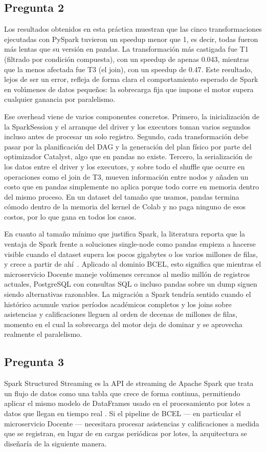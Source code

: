 \documentclass[11pt,a4paper]{article}
\begin{document}
\subsection*{Pregunta 2}
Los resultados obtenidos en esta práctica muestran que las cinco transformaciones ejecutadas con PySpark tuvieron un speedup menor que 1, es decir, todas fueron más lentas que su versión en pandas. La transformación más castigada fue T1 (filtrado por condición compuesta), con un speedup de apenas 0.043, mientras que la menos afectada fue T3 (el join), con un speedup de 0.47. Este resultado, lejos de ser un error, refleja de forma clara el comportamiento esperado de Spark en volúmenes de datos pequeños: la sobrecarga fija que impone el motor supera cualquier ganancia por paralelismo.

Ese overhead viene de varios componentes concretos. Primero, la inicialización de la SparkSession y el arranque del driver y los executors toman varios segundos incluso antes de procesar un solo registro. Segundo, cada transformación debe pasar por la planificación del DAG y la generación del plan físico por parte del optimizador Catalyst, algo que en pandas no existe. Tercero, la serialización de los datos entre el driver y los executors, y sobre todo el shuffle que ocurre en operaciones como el join de T3, mueven información entre nodos y añaden un costo que en pandas simplemente no aplica porque todo corre en memoria dentro del mismo proceso. En un dataset del tamaño que usamos, pandas termina cómodo dentro de la memoria del kernel de Colab y no paga ninguno de esos costos, por lo que gana en todos los casos.

En cuanto al tamaño mínimo que justifica Spark, la literatura reporta que la ventaja de Spark frente a soluciones single-node como pandas empieza a hacerse visible cuando el dataset supera los pocos gigabytes o los varios millones de filas, y crece a partir de ahí~\cite{ahmed2020}. Aplicado al dominio BCEL, esto significa que mientras el microservicio Docente maneje volúmenes cercanos al medio millón de registros actuales, PostgreSQL con consultas SQL o incluso pandas sobre un dump siguen siendo alternativas razonables. La migración a Spark tendría sentido cuando el histórico acumule varios períodos académicos completos y los joins sobre asistencias y calificaciones lleguen al orden de decenas de millones de filas, momento en el cual la sobrecarga del motor deja de dominar y se aprovecha realmente el paralelismo.

\subsection*{Pregunta 3}
Spark Structured Streaming es la API de streaming de Apache Spark que trata un
flujo de datos como una tabla que crece de forma continua, permitiendo aplicar
el mismo modelo de DataFrames usado en el procesamiento por lotes a datos que
llegan en tiempo real \cite{chambers2018}. Si el pipeline de BCEL --- en
particular el microservicio Docente --- necesitara procesar asistencias y
calificaciones a medida que se registran, en lugar de en cargas periódicas por
lotes, la arquitectura se diseñaría de la siguiente manera.
\end{document}
